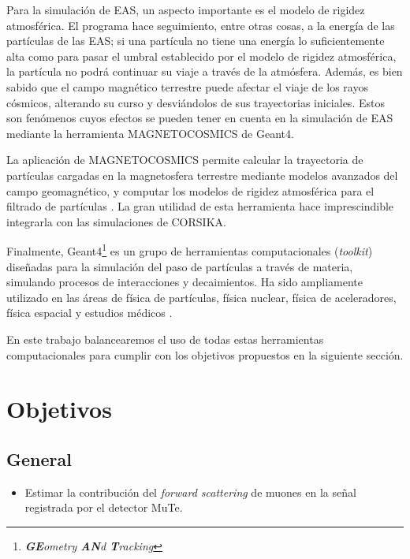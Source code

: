 \documentclass[12pt]{report}
\begin{document}
Para la simulación de EAS, un aspecto importante es el modelo de rigidez atmosférica. El programa hace seguimiento, entre otras cosas, a la energía de las partículas de las EAS; si una partícula no tiene una energía lo suficientemente alta como para pasar el umbral establecido por el modelo de rigidez atmosférica, la partícula no podrá continuar su viaje a través de la atmósfera. Además, es bien sabido que el campo magnético terrestre puede afectar el viaje de los rayos cósmicos, alterando su curso y desviándolos de sus trayectorias iniciales. Estos son fenómenos cuyos efectos se pueden tener en cuenta en la simulación de EAS mediante la herramienta MAGNETOCOSMICS de Geant4.

La aplicación de MAGNETOCOSMICS permite calcular la trayectoria de partículas cargadas en la magnetosfera terrestre mediante modelos avanzados del campo geomagnético, y computar los modelos de rigidez atmosférica para el filtrado de partículas \cite{magnetocosmics}. La gran utilidad de esta herramienta hace imprescindible integrarla con las simulaciones de CORSIKA.

Finalmente, Geant4\footnote{\textit{\textbf{GE}ometry \textbf{AN}d \textbf{T}racking}} es un grupo de herramientas computacionales (\textit{toolkit}) diseñadas para la simulación del paso de partículas a través de materia, simulando procesos de interacciones y decaimientos. Ha sido ampliamente utilizado en las áreas de física de partículas, física nuclear, física de aceleradores, física espacial y estudios médicos \cite{agostinelli2003geant4}.

En este trabajo balancearemos el uso de todas estas herramientas computacionales para cumplir con los objetivos propuestos en la siguiente sección.














\section*{Objetivos}

\subsection*{General}
\begin{itemize}
    \item Estimar la contribución del \textit{forward scattering} de muones en la señal registrada por el detector MuTe.
\end{itemize}
\end{document}
